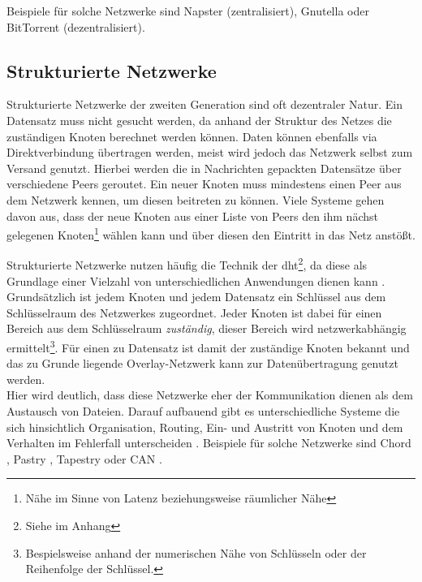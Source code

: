 Beispiele für solche Netzwerke sind Napster (zentralisiert), Gnutella oder BitTorrent (dezentralisiert).

\subsection{Strukturierte Netzwerke}
Strukturierte Netzwerke der zweiten Generation sind oft dezentraler Natur. Ein Datensatz muss nicht gesucht werden, da anhand der Struktur des Netzes die zuständigen Knoten berechnet werden können. Daten können ebenfalls via Direktverbindung übertragen werden, meist wird jedoch das Netzwerk selbst zum Versand genutzt. Hierbei werden die in Nachrichten gepackten Datensätze über verschiedene Peers geroutet. Ein neuer Knoten muss mindestens einen Peer aus dem Netzwerk kennen, um diesen beitreten zu können. Viele Systeme gehen davon aus, dass der neue Knoten aus einer Liste von Peers den ihm nächst gelegenen Knoten\footnote{Nähe im Sinne von Latenz beziehungsweise räumlicher Nähe} wählen kann und über diesen den Eintritt in das Netz anstößt.

Strukturierte Netzwerke nutzen häufig die Technik der \acf{dht}\footnote{Siehe  im Anhang}, da diese als Grundlage einer Vielzahl von unterschiedlichen Anwendungen dienen kann \cite{Wehrle2005, Ghodsi2006AlgorithmsDHT}. Grundsätzlich ist jedem Knoten und jedem Datensatz ein Schlüssel aus dem Schlüsselraum des Netzwerkes zugeordnet. Jeder Knoten ist dabei für einen Bereich aus dem Schlüsselraum \emph{zuständig}, dieser Bereich wird netzwerkabhängig ermittelt\footnote{Bespielsweise anhand der numerischen Nähe von Schlüsseln oder der Reihenfolge der Schlüssel.}. Für einen zu Datensatz ist damit der zuständige Knoten bekannt und das zu Grunde liegende Overlay-Netzwerk kann zur Datenübertragung genutzt werden.\\
Hier wird deutlich, dass diese Netzwerke eher der Kommunikation dienen als dem Austausch von Dateien. Darauf aufbauend gibt es unterschiedliche Systeme die sich hinsichtlich Organisation, Routing, Ein- und Austritt von Knoten und dem Verhalten im Fehlerfall unterscheiden \cite{Goetz2005, Lua2005Survey}. Beispiele für solche Netzwerke sind Chord \cite{Hosseini2007Survey}, Pastry \cite{Rowstron2001}, Tapestry \cite{Zhao2001Tapestry,Zhao2004Tapestry} oder CAN \cite{Ratnasamy2001Scalable}. 

